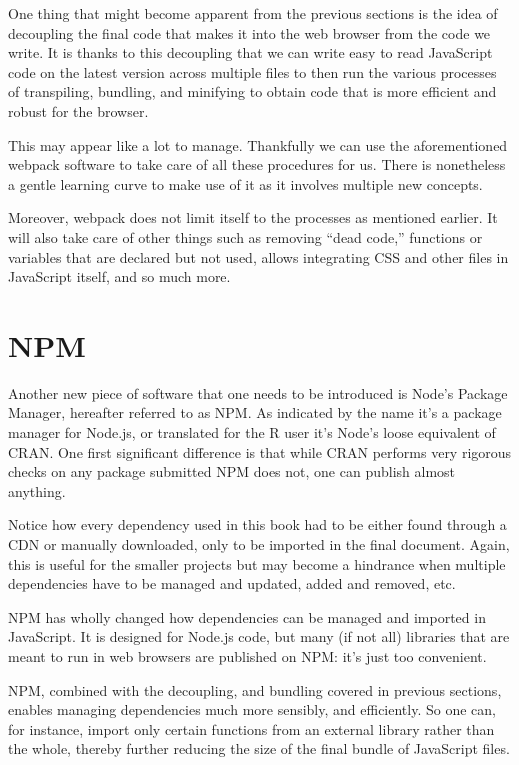 \documentclass[
  10pt,
]{krantz}
\begin{document}
One thing that might become apparent from the previous sections is the idea of decoupling the final code that makes it into the web browser from the code we write. It is thanks to this decoupling that we can write easy to read JavaScript code on the latest version across multiple files to then run the various processes of transpiling, bundling, and minifying to obtain code that is more efficient and robust for the browser.

This may appear like a lot to manage. Thankfully we can use the aforementioned webpack software to take care of all these procedures for us. There is nonetheless a gentle learning curve to make use of it as it involves multiple new concepts.

Moreover, webpack does not limit itself to the processes as mentioned earlier. It will also take care of other things such as removing ``dead code,'' functions or variables that are declared but not used, allows integrating CSS and other files in JavaScript itself, and so much more.

\hypertarget{webpack-npm}{%
\section{NPM}\label{webpack-npm}}

Another new piece of software that one needs to be introduced is Node's Package Manager, hereafter referred to as NPM. As indicated by the name it's a package manager for Node.js, or translated for the R user it's Node's loose equivalent of CRAN. One first significant difference is that while CRAN performs very rigorous checks on any package submitted NPM does not, one can publish almost anything.

Notice how every dependency used in this book had to be either found through a CDN or manually downloaded, only to be imported in the final document. Again, this is useful for the smaller projects but may become a hindrance when multiple dependencies have to be managed and updated, added and removed, etc.

NPM has wholly changed how dependencies can be managed and imported in JavaScript. It is designed for Node.js code, but many (if not all) libraries that are meant to run in web browsers are published on NPM: it's just too convenient.

NPM, combined with the decoupling, and bundling covered in previous sections, enables managing dependencies much more sensibly, and efficiently. So one can, for instance, import only certain functions from an external library rather than the whole, thereby further reducing the size of the final bundle of JavaScript files.
\end{document}
